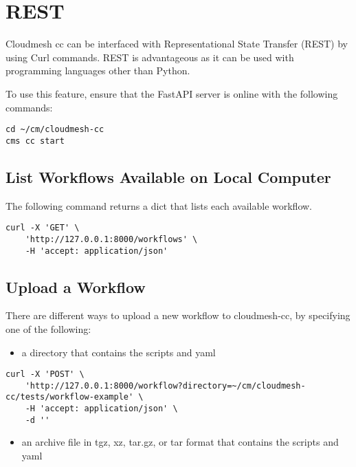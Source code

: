 \section{REST}\label{rest}

Cloudmesh cc can be interfaced with Representational State Transfer
(REST) by using Curl commands. REST is advantageous as it can be used
with programming languages other than Python.

To use this feature, ensure that the FastAPI server is online with the
following commands:

\begin{verbatim}
cd ~/cm/cloudmesh-cc
cms cc start
\end{verbatim}

\subsection{List Workflows Available on Local
Computer}\label{list-workflows-available-on-local-computer}

The following command returns a dict that lists each available workflow.

\begin{verbatim}
curl -X 'GET' \
    'http://127.0.0.1:8000/workflows' \
    -H 'accept: application/json'
\end{verbatim}

\subsection{Upload a Workflow}\label{upload-a-workflow}

There are different ways to upload a new workflow to cloudmesh-cc, by
specifying one of the following:

\begin{itemize}
\item
  a directory that contains the scripts and yaml
\end{itemize}

\begin{verbatim}
curl -X 'POST' \
    'http://127.0.0.1:8000/workflow?directory=~/cm/cloudmesh-cc/tests/workflow-example' \
    -H 'accept: application/json' \
    -d ''
\end{verbatim}

\begin{itemize}
\item
  an archive file in tgz, xz, tar.gz, or tar format that contains the
  scripts and yaml
\end{itemize}


